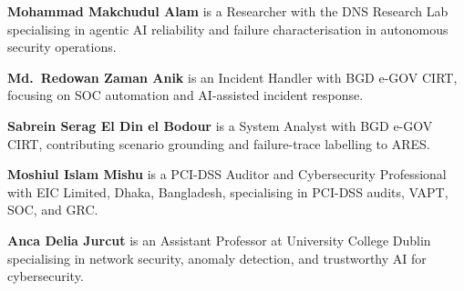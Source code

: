 \documentclass[journal,compsoc]{IEEEtran}
\newcommand{\ARES}{\textsc{ARES}}
\begin{document}
\balance

\renewenvironment{IEEEbiographynophoto}[1]{%
  \par\vspace{0.35em}%
  \noindent\textbf{#1}\space\ignorespaces}{%
  \par}
\begin{IEEEbiographynophoto}{Mohammad Makchudul Alam}
is a Researcher with the DNS Research Lab specialising in agentic
AI reliability and failure characterisation in autonomous security
operations.
\end{IEEEbiographynophoto}

\begin{IEEEbiographynophoto}{Md.~Redowan Zaman Anik}
is an Incident Handler with BGD e-GOV CIRT, focusing on SOC
automation and AI-assisted incident response.
\end{IEEEbiographynophoto}

\begin{IEEEbiographynophoto}{Sabrein Serag El Din el Bodour}
is a System Analyst with BGD e-GOV CIRT, contributing scenario
grounding and failure-trace labelling to \ARES{}.
\end{IEEEbiographynophoto}

\begin{IEEEbiographynophoto}{Moshiul Islam Mishu}
is a PCI-DSS Auditor and Cybersecurity Professional with EIC Limited,
Dhaka, Bangladesh, specialising in PCI-DSS audits, VAPT, SOC, and GRC.
\end{IEEEbiographynophoto}

\begin{IEEEbiographynophoto}{Anca Delia Jurcut}
is an Assistant Professor at University College Dublin specialising
in network security, anomaly detection, and trustworthy AI for
cybersecurity.
\end{IEEEbiographynophoto}
\end{document}
